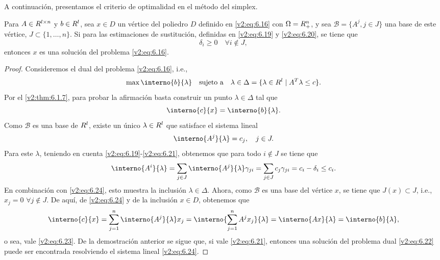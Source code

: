 A continuación, presentamos el criterio de optimalidad en el método del simplex.

\begin{theorem}\label{v2:thm:6.1.11}
    Para $A \in R^{l \times n}$ y $b \in R^l$, sea $x \in D$ un vértice del poliedro $D$ definido en \eqref{v2:eq:6.16} con $\Omega = R^n_+$, y sea $\mathcal{B} = \{ A^j, j \in J \}$ una base de este vértice, $J \subset \{1, \dots, n\}$.
    Si para las estimaciones de sustitución, definidas en \eqref{v2:eq:6.19} y \eqref{v2:eq:6.20}, se tiene que
    \begin{equation}
        \delta_i \ge 0 \quad \forall i \notin J,
        \label{v2:eq:6.21}
    \end{equation}
    entonces $x$ es una solución del problema \eqref{v2:eq:6.16}.
\end{theorem}

\begin{proof}
    Consideremos el dual del problema \eqref{v2:eq:6.16}, i.e.,
    \begin{equation}
        \max \interno{b}{\lambda} \quad \text{sujeto a} \quad \lambda \in \Delta = \{ \lambda \in \R^l \mid A^T \lambda \le c \}.
        \label{v2:eq:6.22}
    \end{equation}
    Por el \cref{v2:thm:6.1.7}, para probar la afirmación basta construir un punto $\lambda \in \Delta$ tal que
    \begin{equation}
        \interno{c}{x} = \interno{b}{\lambda}.
        \label{v2:eq:6.23}
    \end{equation}
    Como $\mathcal{B}$ es una base de $R^l$, existe un único $\lambda \in R^l$ que satisface el sistema lineal
    \begin{equation}
        \interno{A^j}{\lambda} = c_j, \quad j \in J.
        \label{v2:eq:6.24}
    \end{equation}
    Para este $\lambda$, teniendo en cuenta \eqref{v2:eq:6.19}-\eqref{v2:eq:6.21}, obtenemos que para todo $i \notin J$ se tiene que
    \[
        \interno{A^i}{\lambda} = \sum_{j \in J} \interno{A^j}{\lambda} \gamma_{ji} = \sum_{j \in J} c_j \gamma_{ji} = c_i - \delta_i \le c_i.
    \]
    En combinación con \eqref{v2:eq:6.24}, esto muestra la inclusión $\lambda \in \Delta$.
    Ahora, como $\mathcal{B}$ es una base del vértice $x$, se tiene que $J(x) \subset J$, i.e., $x_j = 0$ $\forall j \notin J$. De aquí, de \eqref{v2:eq:6.24} y de la inclusión $x \in D$, obtenemos que
    \[
        \interno{c}{x} = \sum_{j=1}^n \interno{A^j}{\lambda} x_j = \interno{\sum_{j=1}^n A^j x_j}{\lambda} = \interno{Ax}{\lambda} = \interno{b}{\lambda},
    \]
    o sea, vale \eqref{v2:eq:6.23}.
    De la demostración anterior se sigue que, si vale \eqref{v2:eq:6.21}, entonces una solución del problema dual \eqref{v2:eq:6.22} puede ser encontrada resolviendo el sistema lineal \eqref{v2:eq:6.24}.
\end{proof}

